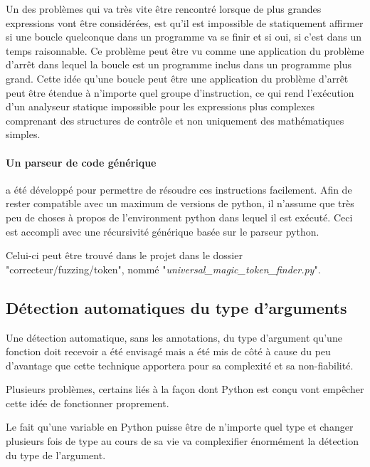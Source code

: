 \documentclass[a4paper]{report}
\begin{document}
Un des problèmes qui va très vite être rencontré lorsque de plus grandes expressions vont être considérées, est qu'il est impossible de statiquement affirmer si une boucle quelconque dans un programme va se finir et si oui, si c'est dans un temps raisonnable.
Ce problème peut être vu comme une application du problème d'arrêt \cite{burkholder1987halting} dans lequel la boucle est un programme inclus dans un programme plus grand.
Cette idée qu'une boucle peut être une application du problème d'arrêt peut être étendue à n'importe quel groupe d'instruction, ce qui rend l'exécution d'un analyseur statique impossible pour les expressions plus complexes comprenant des structures de contrôle et non uniquement des mathématiques simples.

\paragraph{Un parseur de code générique} a été développé pour permettre de résoudre ces instructions facilement.
Afin de rester compatible avec un maximum de versions de python, il n'assume que très peu de choses à propos de l'environment python dans lequel il est exécuté.
Ceci est accompli avec une récursivité générique basée sur le parseur python.

Celui-ci peut être trouvé dans le projet dans le dossier "correcteur/fuzzing/token", nommé "\textit{universal\_magic\_token\_finder.py}".   


\subsection{Détection automatiques du type d'arguments}
Une détection automatique, sans les annotations, du type d'argument qu'une fonction doit recevoir a été envisagé mais a été mis de côté à cause du peu d'avantage que cette technique apportera pour sa complexité et sa non-fiabilité.

Plusieurs problèmes, certains liés à la façon dont Python est conçu vont empêcher cette idée de fonctionner proprement.

Le fait qu'une variable en Python puisse être de n'importe quel type et changer plusieurs fois de type au cours de sa vie va complexifier énormément la détection du type de l'argument.
\end{document}
